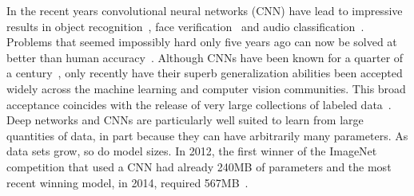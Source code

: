 \documentclass{article} %
\begin{document}
\begin{abstract}
\end{abstract}

In the recent years convolutional neural networks (CNN) have lead to impressive results in object recognition~\cite{krizhevsky2012imagenet}, face verification~\cite{schroff2015facenet} and audio classification~\cite{lee2009unsupervised}. Problems that seemed impossibly hard only five years ago can now be solved at better than human accuracy~\cite{he2015delving}.
Although CNNs have been known for a quarter of a century~\cite{fukushima1980neocognitron}, only recently have their superb generalization abilities been accepted widely across the machine learning and computer vision communities.
This broad acceptance coincides with the release of very large collections of labeled data~\cite{deng2009imagenet}. Deep networks and CNNs are particularly well suited to learn from large quantities of data, in part because they can have arbitrarily many parameters. As data sets grow, so do model sizes. In 2012, the first winner of the ImageNet competition that used a CNN had already 240MB of parameters and the most recent winning model, in 2014, required 567MB~\cite{SimonyanZ14a}.
\end{document}
